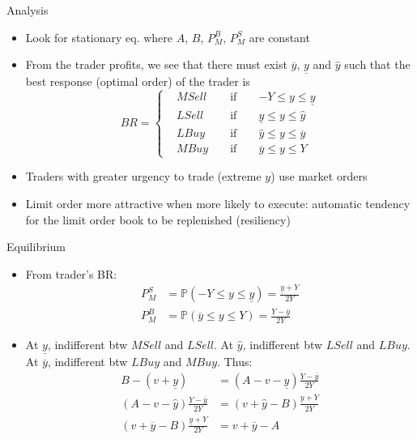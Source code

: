 \documentclass[english,10pt
,aspectratio=169
]{beamer}
\begin{document}
\begin{frame}{Analysis}
	\begin{itemize}
		\item Look for stationary eq. where  $A$, $B$, $P^B_M$, $P^S_M$ are constant 
		\item From the trader profits, we see that there must exist $\overline{y}$,  $\underline{y}$ and $\hat{y}$ such that the best response (optimal order) of the trader is
		\begin{equation*}
		BR=\left\{ \begin{aligned}
		&MSell		&& 	\text{ if } 	&&	-Y\le y \le \underline{y} \\
		&LSell 		&&	\text{ if } 	&&	\underline{y} \le y \le \hat{y} \\
		&LBuy		&&	\text{ if } 	&&	\hat{y} \le y \le \overline{y} \\
		&MBuy	&&	\text{ if } 	&&	\overline{y} \le y \le Y
		\end{aligned}
		\right.
		\end{equation*}
		\item Traders with greater urgency to trade (extreme $y$) use market orders
		\item Limit order more attractive when more likely to execute:  automatic tendency for the limit order book to be replenished (resiliency)
	\end{itemize}
\end{frame}


\begin{frame}{Equilibrium}
	\begin{itemize}
		\item From trader's BR:
		\begin{align*}
		P^S_M 	&=\mathbb{P}(-Y\le y \le \underline{y})=\frac{\underline{y}+Y}{2Y} \\
		P^B_M 	&=\mathbb{P}(\overline{y} \le y \le Y)=\frac{Y-\overline{y}}{2Y}
		\end{align*}
		\item At $\underline{y}$, indifferent btw $MSell$ and $LSell$. At $\hat{y}$, indifferent btw $LSell$ and $LBuy$. At $\overline{y}$, indifferent btw $LBuy$ and $MBuy$. Thus:
		\begin{align}
		B-(v+\underline{y}) 					& = (A-v-\underline{y})\frac{Y-\overline{y}}{2Y} \label{eq1}\\
		(A-v-\hat{y}) \frac{Y-\overline{y}}{2Y} 			& = (v+\hat{y}-B)\frac{\underline{y}+Y}{2Y} \label{eq2}\\
		(v+\overline{y}-B) \frac{\underline{y}+Y}{2Y}  	& = v+\overline{y}-A \label{eq3}
		\end{align}
	\end{itemize}
\end{frame}
\end{document}
